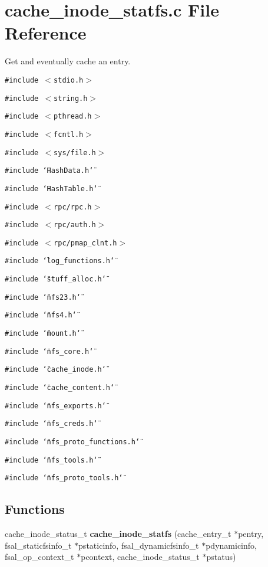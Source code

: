 \section{cache\_\-inode\_\-statfs.c File Reference}
\label{cache__inode__statfs_8c}
Get and eventually cache an entry. 

{\tt \#include $<$stdio.h$>$}\par
{\tt \#include $<$string.h$>$}\par
{\tt \#include $<$pthread.h$>$}\par
{\tt \#include $<$fcntl.h$>$}\par
{\tt \#include $<$sys/file.h$>$}\par
{\tt \#include \char`\"{}Hash\-Data.h\char`\"{}}\par
{\tt \#include \char`\"{}Hash\-Table.h\char`\"{}}\par
{\tt \#include $<$rpc/rpc.h$>$}\par
{\tt \#include $<$rpc/auth.h$>$}\par
{\tt \#include $<$rpc/pmap\_\-clnt.h$>$}\par
{\tt \#include \char`\"{}log\_\-functions.h\char`\"{}}\par
{\tt \#include \char`\"{}stuff\_\-alloc.h\char`\"{}}\par
{\tt \#include \char`\"{}nfs23.h\char`\"{}}\par
{\tt \#include \char`\"{}nfs4.h\char`\"{}}\par
{\tt \#include \char`\"{}mount.h\char`\"{}}\par
{\tt \#include \char`\"{}nfs\_\-core.h\char`\"{}}\par
{\tt \#include \char`\"{}cache\_\-inode.h\char`\"{}}\par
{\tt \#include \char`\"{}cache\_\-content.h\char`\"{}}\par
{\tt \#include \char`\"{}nfs\_\-exports.h\char`\"{}}\par
{\tt \#include \char`\"{}nfs\_\-creds.h\char`\"{}}\par
{\tt \#include \char`\"{}nfs\_\-proto\_\-functions.h\char`\"{}}\par
{\tt \#include \char`\"{}nfs\_\-tools.h\char`\"{}}\par
{\tt \#include \char`\"{}nfs\_\-proto\_\-tools.h\char`\"{}}\par
\subsection*{Functions}
\begin{CompactItemize}
\item 
cache\_\-inode\_\-status\_\-t {\bf cache\_\-inode\_\-statfs} (cache\_\-entry\_\-t $\ast$pentry, fsal\_\-staticfsinfo\_\-t $\ast$pstaticinfo, fsal\_\-dynamicfsinfo\_\-t $\ast$pdynamicinfo, fsal\_\-op\_\-context\_\-t $\ast$pcontext, cache\_\-inode\_\-status\_\-t $\ast$pstatus)
\end{CompactItemize}


